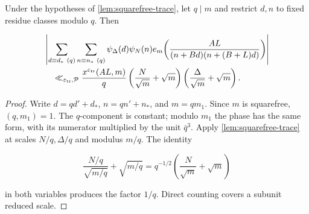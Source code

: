 \begin{lemma}
\label{lem:congruence-trace}
Under the hypotheses of \cref{lem:squarefree-trace}, let $q\mid m$ and
restrict $d,n$ to fixed residue classes modulo $q$.  Then

\begin{align}
&\left|\sum_{d\equiv d_*\ (q)}\sum_{n\equiv n_*\ (q)}
\psi_\Delta(d)\psi_N(n)
e_m\!\left(\frac{AL}{(n+Bd)(n+(B+L)d)}\right)\right|\notag\\
&\quad\ll_{\varepsilon_{\rm tr},\mathcal P}
\frac{x^{\varepsilon_{\rm tr}}(AL,m)}q
\left(\frac N{\sqrt m}+\sqrt m\right)
\left(\frac\Delta{\sqrt m}+\sqrt m\right).
\label{eq:congruence-trace}
\end{align}
\end{lemma}

\begin{proof}
Write $d=qd'+d_*$, $n=qn'+n_*$, and $m=qm_1$.  Since $m$ is
squarefree, $(q,m_1)=1$.  The $q$-component is constant; modulo $m_1$
the phase has the same form, with its numerator multiplied by the unit
$\bar q^3$.  Apply \cref{lem:squarefree-trace} at scales $N/q,\Delta/q$
and modulus $m/q$.  The identity

\[
 \frac{N/q}{\sqrt{m/q}}+\sqrt{m/q}
 =q^{-1/2}\left(\frac N{\sqrt m}+\sqrt m\right)
\]

in both variables produces the factor $1/q$.  Direct counting covers a
subunit reduced scale.
\end{proof}

